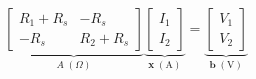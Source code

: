 \documentclass[border=12pt]{standalone}
\begin{document}
\color{weeknavy}
\parbox{16cm}{\centering $\displaystyle
\underbrace{\begin{bmatrix}
R_1+R_s & -R_s\\
-R_s & R_2+R_s
\end{bmatrix}}_{A\;(\Omega)}
\underbrace{\begin{bmatrix}I_1\\I_2\end{bmatrix}}_{\mathbf{x}\;(\mathrm A)}
=
\underbrace{\begin{bmatrix}V_1\\V_2\end{bmatrix}}_{\mathbf{b}\;(\mathrm V)}$}
\end{document}
